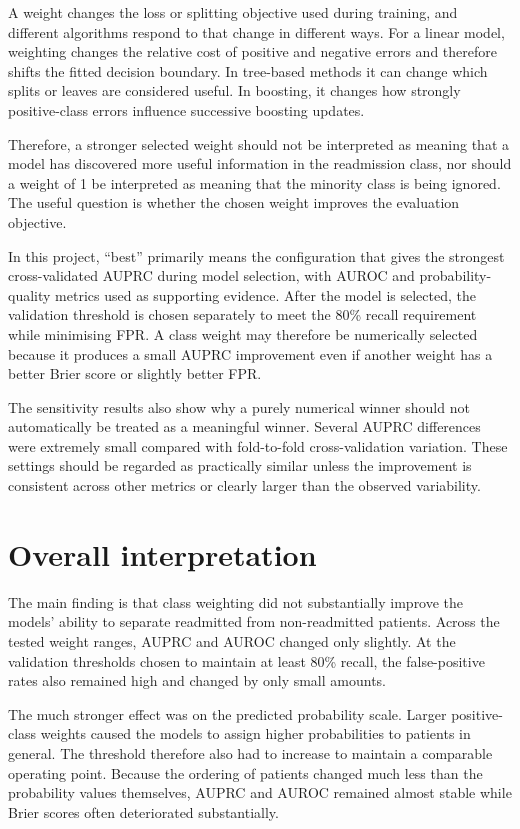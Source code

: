 \documentclass[11pt,a4paper]{article}
\begin{document}
A weight changes the loss or splitting objective used during training, and different algorithms respond to that change in different ways. For a linear model, weighting changes the relative cost of positive and negative errors and therefore shifts the fitted decision boundary. In tree-based methods it can change which splits or leaves are considered useful. In boosting, it changes how strongly positive-class errors influence successive boosting updates.

Therefore, a stronger selected weight should not be interpreted as meaning that a model has discovered more useful information in the readmission class, nor should a weight of 1 be interpreted as meaning that the minority class is being ignored. The useful question is whether the chosen weight improves the evaluation objective.

In this project, ``best'' primarily means the configuration that gives the strongest cross-validated AUPRC during model selection, with AUROC and probability-quality metrics used as supporting evidence. After the model is selected, the validation threshold is chosen separately to meet the 80\% recall requirement while minimising FPR. A class weight may therefore be numerically selected because it produces a small AUPRC improvement even if another weight has a better Brier score or slightly better FPR.

The sensitivity results also show why a purely numerical winner should not automatically be treated as a meaningful winner. Several AUPRC differences were extremely small compared with fold-to-fold cross-validation variation. These settings should be regarded as practically similar unless the improvement is consistent across other metrics or clearly larger than the observed variability.

\section{Overall interpretation}

The main finding is that class weighting did not substantially improve the models' ability to separate readmitted from non-readmitted patients. Across the tested weight ranges, AUPRC and AUROC changed only slightly. At the validation thresholds chosen to maintain at least 80\% recall, the false-positive rates also remained high and changed by only small amounts.

The much stronger effect was on the predicted probability scale. Larger positive-class weights caused the models to assign higher probabilities to patients in general. The threshold therefore also had to increase to maintain a comparable operating point. Because the ordering of patients changed much less than the probability values themselves, AUPRC and AUROC remained almost stable while Brier scores often deteriorated substantially.
\end{document}
